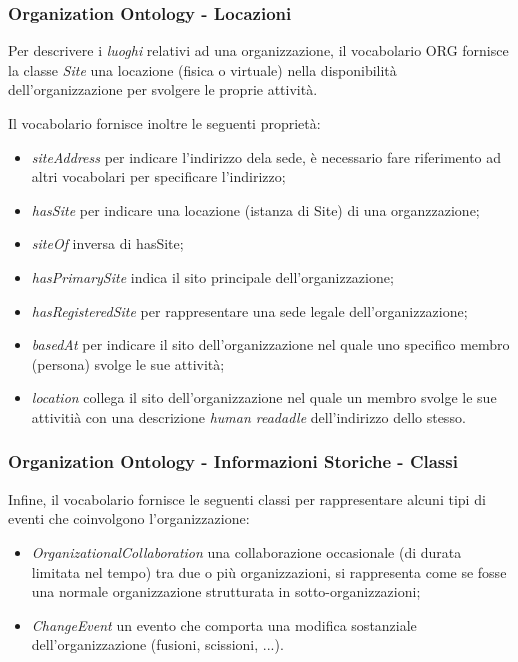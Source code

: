 \documentclass[8pt]{beamer}
\begin{document}
\begin{frame}
  \frametitle{Organization Ontology - Locazioni}
  
  Per descrivere i \emph{luoghi} relativi ad una organizzazione, il vocabolario ORG
  fornisce la classe
  \vspace{\baselineskip}
  \emph{Site} una locazione (fisica o virtuale) nella disponibilit\`a dell'organizzazione per svolgere
  le proprie attivit\`a.
  
  Il vocabolario fornisce inoltre le seguenti propriet\`a:
  \begin{itemize}[<+->]
   \item \emph{siteAddress} per indicare l'indirizzo dela sede, \`e necessario fare riferimento ad altri
   vocabolari per specificare l'indirizzo;
   \item \emph{hasSite} per indicare una locazione (istanza di Site) di una organzzazione;
   \item \emph{siteOf} inversa di hasSite;
   \item \emph{hasPrimarySite} indica il sito principale dell'organizzazione;
   \item \emph{hasRegisteredSite} per rappresentare una sede legale dell'organizzazione;
   \item \emph{basedAt} per indicare il sito dell'organizzazione nel quale uno specifico membro (persona)
   svolge le sue attivit\`a;
   \item \emph{location} collega il sito dell'organizzazione nel quale un membro svolge 
   le sue attiviti\`a con una descrizione \emph{human readadle} dell'indirizzo dello stesso.
  \end{itemize}
\end{frame}

\begin{frame}
  \frametitle{Organization Ontology - Informazioni Storiche - Classi}
  Infine, il vocabolario fornisce le seguenti classi per rappresentare alcuni tipi di eventi che 
  coinvolgono l'organizzazione:
  \begin{itemize}[<+->]
   \item \emph{OrganizationalCollaboration} una collaborazione occasionale (di durata limitata nel tempo)
   tra due o pi\`u organizzazioni, si rappresenta come se fosse una normale organizzazione strutturata
   in sotto-organizzazioni;
   \item \emph{ChangeEvent} un evento che comporta una modifica sostanziale dell'organizzazione
   (fusioni, scissioni, ...).
  \end{itemize}
\end{frame}
\end{document}
